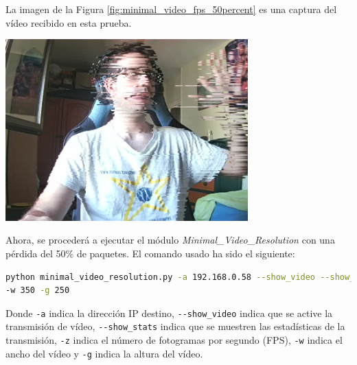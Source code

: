 \newpage
La imagen de la Figura \ref{fig:minimal_video_fps_50percent} es una captura del vídeo recibido en esta prueba.
\begin{center}
  \includegraphics[width = 0.7\textwidth]{images/VideoRecibido9.2.png}
  \label{fig:minimal_video_fps_50percent}
\end{center}

\newpage


Ahora, se procederá a ejecutar el módulo \textit{Minimal\_Video\_Resolution} con una pérdida del 50\% de paquetes. El comando usado ha sido el siguiente:
\begin{lstlisting}[language=bash,basicstyle=\ttfamily\scriptsize]
python minimal_video_resolution.py -a 192.168.0.58 --show_video --show_stats -z 12 \\
-w 350 -g 250
\end{lstlisting}
Donde \verb|-a| indica la dirección IP destino, \verb|--show_video| indica que se active la transmisión de vídeo, \verb|--show_stats| indica que se muestren las estadísticas de la transmisión, \verb|-z| indica el número de fotogramas por segundo (FPS), \verb|-w| indica el ancho del vídeo y \verb|-g| indica la altura del vídeo.
\vspace{\baselineskip}


